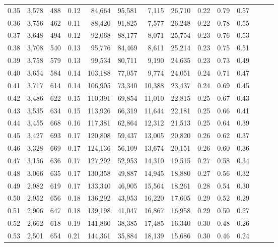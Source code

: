 \begin{tabular}{rrrrrrrrrrrrrr}
0.35 &  3,578 &  488 &  0.12 &   84,664 &   95,581 &   7,115 &  26,710 &  0.22 &  0.79 &      0.57 \\
0.36 &  3,756 &  462 &  0.11 &   88,420 &   91,825 &   7,577 &  26,248 &  0.22 &  0.78 &      0.55 \\
0.37 &  3,648 &  494 &  0.12 &   92,068 &   88,177 &   8,071 &  25,754 &  0.23 &  0.76 &      0.53 \\
0.38 &  3,708 &  540 &  0.13 &   95,776 &   84,469 &   8,611 &  25,214 &  0.23 &  0.75 &      0.51 \\
0.39 &  3,758 &  579 &  0.13 &   99,534 &   80,711 &   9,190 &  24,635 &  0.23 &  0.73 &      0.49 \\
0.40 &  3,654 &  584 &  0.14 &  103,188 &   77,057 &   9,774 &  24,051 &  0.24 &  0.71 &      0.47 \\
0.41 &  3,717 &  614 &  0.14 &  106,905 &   73,340 &  10,388 &  23,437 &  0.24 &  0.69 &      0.45 \\
0.42 &  3,486 &  622 &  0.15 &  110,391 &   69,854 &  11,010 &  22,815 &  0.25 &  0.67 &      0.43 \\
0.43 &  3,535 &  634 &  0.15 &  113,926 &   66,319 &  11,644 &  22,181 &  0.25 &  0.66 &      0.41 \\
0.44 &  3,455 &  668 &  0.16 &  117,381 &   62,864 &  12,312 &  21,513 &  0.25 &  0.64 &      0.39 \\
0.45 &  3,427 &  693 &  0.17 &  120,808 &   59,437 &  13,005 &  20,820 &  0.26 &  0.62 &      0.37 \\
0.46 &  3,328 &  669 &  0.17 &  124,136 &   56,109 &  13,674 &  20,151 &  0.26 &  0.60 &      0.36 \\
0.47 &  3,156 &  636 &  0.17 &  127,292 &   52,953 &  14,310 &  19,515 &  0.27 &  0.58 &      0.34 \\
0.48 &  3,066 &  635 &  0.17 &  130,358 &   49,887 &  14,945 &  18,880 &  0.27 &  0.56 &      0.32 \\
0.49 &  2,982 &  619 &  0.17 &  133,340 &   46,905 &  15,564 &  18,261 &  0.28 &  0.54 &      0.30 \\
0.50 &  2,952 &  656 &  0.18 &  136,292 &   43,953 &  16,220 &  17,605 &  0.29 &  0.52 &      0.29 \\
0.51 &  2,906 &  647 &  0.18 &  139,198 &   41,047 &  16,867 &  16,958 &  0.29 &  0.50 &      0.27 \\
0.52 &  2,662 &  618 &  0.19 &  141,860 &   38,385 &  17,485 &  16,340 &  0.30 &  0.48 &      0.26 \\
0.53 &  2,501 &  654 &  0.21 &  144,361 &   35,884 &  18,139 &  15,686 &  0.30 &  0.46 &      0.24 \\

\end{tabular}
